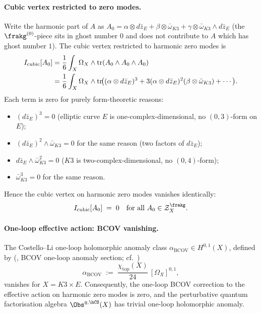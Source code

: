 \paragraph{Cubic vertex restricted to zero modes.}
Write the harmonic part of $A$ as
$A_0 = \alpha \otimes d\bar z_E + \beta \otimes \bar\omega_{K3} + \gamma \otimes \bar\omega_{K3} \wedge d\bar z_E$
\textup{(}the $\frakg^{(0)}$-piece sits in ghost number $0$ and does not
contribute to $A$ which has ghost number $1$\textup{).} The cubic vertex
restricted to harmonic zero modes is
\begin{align}
\label{eq:cubic-vertex-zero-modes}
 I_{\mathrm{cubic}}[A_0]
 &= \frac{1}{6} \int_X \Omega_X \wedge \operatorname{tr}(A_0 \wedge A_0 \wedge A_0) \notag \\
 &= \frac{1}{6} \int_X \Omega_X \wedge \operatorname{tr}\!\bigl((\alpha \otimes d\bar z_E)^3 + 3 (\alpha \otimes d\bar z_E)^2 (\beta \otimes \bar\omega_{K3}) + \cdots\bigr).
\end{align}
Each term is zero for purely form-theoretic reasons:
\begin{itemize}
\item $(d\bar z_E)^3 = 0$ \textup{(}elliptic curve $E$ is one-complex-dimensional, no
$(0, 3)$-form on $E$\textup{)};
\item $(d\bar z_E)^2 \wedge \bar\omega_{K3} = 0$ for the same reason
\textup{(}two factors of $d\bar z_E$\textup{);}
\item $d\bar z_E \wedge \bar\omega_{K3}^2 = 0$ \textup{(}$K3$ is two-complex-dimensional,
no $(0, 4)$-form\textup{);}
\item $\bar\omega_{K3}^3 = 0$ for the same reason.
\end{itemize}
Hence the cubic vertex on harmonic zero modes vanishes identically:
\begin{equation}
\label{eq:cubic-vertex-zero-modes-vanishes}
 I_{\mathrm{cubic}}[A_0] \;=\; 0 \quad \text{for all } A_0 \in \mathcal{Z}_X^\frakg.
\end{equation}

\paragraph{One-loop effective action: BCOV vanishing.}

\begin{theorem}
\label{thm:bcov-anomaly-vanishes-k3xe}
The Costello--Li one-loop holomorphic anomaly class
$\alpha_{\mathrm{BCOV}} \in H^{0, 1}(X)$, defined by
\textup{(}\cite{CostelloLi2012}, BCOV one-loop anomaly section;
cf.~\cite{BCOV1993}\textup{)}
\begin{equation}
\label{eq:bcov-anomaly-class}
 \alpha_{\mathrm{BCOV}} \;:=\; \frac{\chi_{\mathrm{top}}(X)}{24}\, [\Omega_X]^{0, 1},
\end{equation}
vanishes for $X = K3 \times E$. Consequently, the one-loop BCOV
correction to the effective action on harmonic zero modes is zero,
and the perturbative quantum factorisation algebra
$\Obs^{q,\hCS}(X)$ has trivial one-loop holomorphic anomaly.
\end{theorem}

